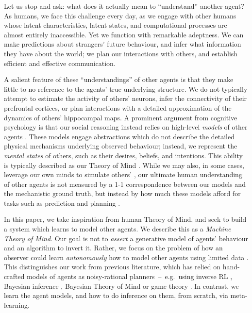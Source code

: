 \documentclass{article}
\begin{document}
Let us stop and ask: what does it actually mean to ``understand'' another agent? As humans, we face this challenge every day, as we engage with other humans whose latent characteristics, latent states, and computational processes are almost entirely inaccessible. Yet we function with remarkable adeptness. We can make predictions about strangers' future behaviour, and infer what information they have about the world; we plan our interactions with others, and establish efficient and effective communication.

A salient feature of these ``understandings'' of other agents is that they make little to no reference to the agents' true underlying structure. We do not typically attempt to estimate the activity of others' neurons, infer the connectivity of their prefrontal cortices, or plan interactions with a detailed approximation of the dynamics of others' hippocampal maps. A prominent argument from cognitive psychology is that our social reasoning instead relies on high-level {\it models} of other agents \cite{gopnik1992child}. These models engage abstractions which do not describe the detailed physical mechanisms underlying observed behaviour; instead, we represent the {\it mental states} of others, such as their desires, beliefs, and intentions. This ability is typically described as our Theory of Mind \cite{premack1978does}. While we may also, in some cases, leverage our own minds to simulate others' \citep[e.g.][]{gordon1986folk, gallese1998mirror}, our ultimate human understanding of other agents is not measured by a 1-1 correspondence between our models and the mechanistic ground truth, but instead by how much these models afford for tasks such as prediction and planning \cite{dennett1991two}.

In this paper, we take inspiration from human Theory of Mind, and seek to build a system which learns to model other agents. We describe this as a {\it Machine Theory of Mind}. Our goal is not to {\it assert} a generative model of agents' behaviour and an algorithm to invert it. Rather, we focus on the problem of how an observer could learn {\it autonomously} how to model other agents using limited data \cite{botvinick2017building}.  This distinguishes our work from previous literature, which has relied on hand-crafted models of agents as noisy-rational planners~--~e.g.\ using inverse RL \cite{ng2000algorithms, abbeel2004apprenticeship}, Bayesian inference \cite{lucas2014child, evans2016learning}, Bayesian Theory of Mind \cite{baker2011bayesian, jara2016naive, Baker2017} or game theory \cite{camerer2004cognitive, yoshida2008game, camerer2010behavioral, lanctot2017unified}. In contrast, we learn the agent models, and how to do inference on them, from scratch, via meta-learning.
\end{document}
